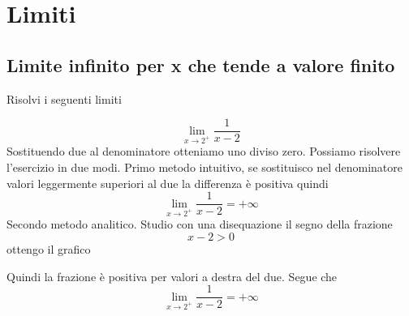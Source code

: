 \chapter{Limiti}
\section{Limite infinito per x che tende a valore finito}
Risolvi i seguenti limiti
\tcbstartrecording


\begin{exercise}
\begin{equation*}
\lim_{x\to 2^+}\dfrac{1}{x-2}
\end{equation*}
	\tcblower
Sostituendo due al denominatore otteniamo uno diviso zero. Possiamo risolvere l'esercizio in due modi. Primo metodo intuitivo, se sostituisco nel denominatore valori leggermente superiori al due la differenza è positiva quindi \begin{equation*}
\lim_{x\to 2^+}\dfrac{1}{x-2}=+\infty
\end{equation*} Secondo metodo analitico. Studio con una disequazione il segno della frazione
\[x-2>0 \] 
ottengo il grafico
\begin{center}
	
\end{center}
Quindi la frazione è positiva per valori a destra del due. Segue che 
\begin{equation*}
\lim_{x\to 2^+}\dfrac{1}{x-2}=+\infty
\end{equation*}
\end{exercise}
